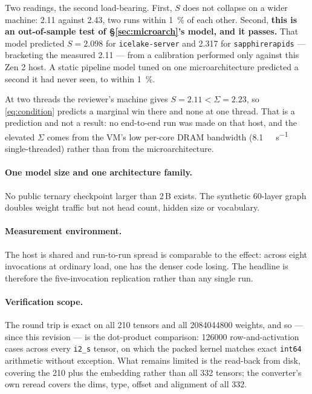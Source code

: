\documentclass[11pt,a4paper]{article}
\newcommand{\code}[1]{\texttt{#1}}
\begin{document}
Two readings, the second load-bearing. First, $S$ does not collapse on a wider
machine: \num{2.11} against \num{2.43}, two runs within \SI{1}{\percent} of each
other. Second, \textbf{this is an out-of-sample test of \S\ref{sec:microarch}'s
model, and it passes.} That model predicted $S = \num{2.098}$ for
\code{icelake-server} and \num{2.317} for \code{sapphirerapids} --- bracketing
the measured \num{2.11} --- from a calibration performed only against this Zen 2
host. A static pipeline model tuned on one microarchitecture predicted a second
it had never seen, to within \SI{1}{\percent}.

At two threads the reviewer's machine gives $S = \num{2.11} < \Sigma =
\num{2.23}$, so \eqref{eq:condition} predicts a marginal win there and none at
one thread. That is a prediction and not a result: no end-to-end run was made on
that host, and the elevated $\Sigma$ comes from the VM's low per-core DRAM
bandwidth (\SI{8.1}{\giga\byte\per\second} single-threaded) rather than from the
microarchitecture.

\paragraph{One model size and one architecture family.} No public ternary
checkpoint larger than 2\,B exists. The synthetic 60-layer graph doubles weight
traffic but not head count, hidden size or vocabulary.

\paragraph{Measurement environment.} The host is shared and run-to-run spread is
comparable to the effect: across eight invocations at ordinary load, one has the
denser code losing. The headline is therefore the five-invocation replication
rather than any single run.

\paragraph{Verification scope.} The round trip is exact on all 210 tensors and
all \num{2084044800} weights, and so --- since this revision --- is the
dot-product comparison: \num{126000} row-and-activation cases across every
\code{i2\_s} tensor, on which the packed kernel matches exact \code{int64}
arithmetic without exception. What remains limited is the read-back from disk,
covering the 210 plus the embedding rather than all 332 tensors; the converter's
own reread covers the dims, type, offset and alignment of all 332.
\end{document}

